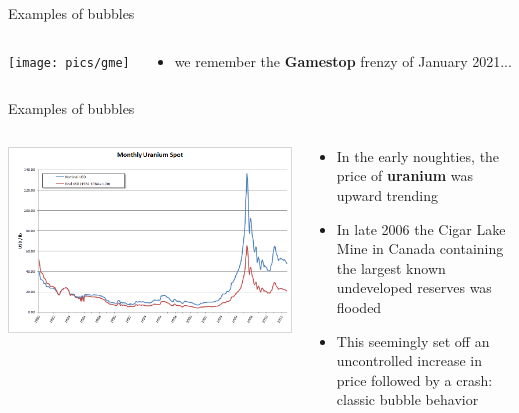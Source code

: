 \documentclass[english,10pt
,aspectratio=169
]{beamer}
\begin{document}
\begin{frame}[handout:0]{Examples of bubbles}
\begin{columns}
	\begin{column}{0.7\linewidth}
		\center
		\texttt{[image: pics/gme]}
	\end{column}
	\begin{column}{0.3\linewidth}
		\begin{itemize}
			\item we remember the \textbf{Gamestop} frenzy of January 2021...
		\end{itemize}
	\end{column}
\end{columns}
\end{frame}


\begin{frame}[handout:0]{Examples of bubbles}
	\begin{columns}
		\begin{column}{0.55\linewidth}
			\center
			\includegraphics[width=\linewidth]{pics/Uranium}
		\end{column}
		\begin{column}{0.45\linewidth}
			\begin{itemize}
				\item In the early noughties, the price of \textbf{uranium} was upward trending
				\item In late 2006 the Cigar Lake Mine in Canada containing the largest known undeveloped reserves was flooded
				\item This seemingly set off an uncontrolled increase in price followed by a crash: classic bubble behavior
			\end{itemize}
		\end{column}
	\end{columns}
\end{frame}
\end{document}
